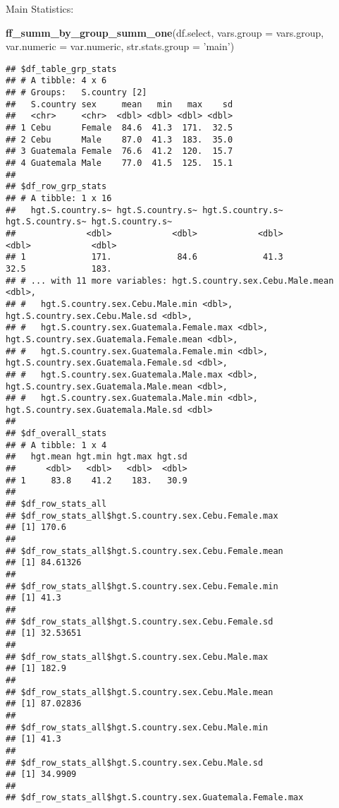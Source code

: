 \documentclass[
]{book}
\newenvironment{Shaded}{\begin{snugshade}}{\end{snugshade}}
\newcommand{\DataTypeTok}[1]{\textcolor[rgb]{0.13,0.29,0.53}{#1}}
\newcommand{\KeywordTok}[1]{\textcolor[rgb]{0.13,0.29,0.53}{\textbf{#1}}}
\newcommand{\NormalTok}[1]{#1}
\newcommand{\StringTok}[1]{\textcolor[rgb]{0.31,0.60,0.02}{#1}}
\begin{document}
Main Statistics:

\begin{Shaded}
\begin{Highlighting}[]
\KeywordTok{ff_summ_by_group_summ_one}\NormalTok{(df.select, }\DataTypeTok{vars.group =}\NormalTok{ vars.group, }\DataTypeTok{var.numeric =}\NormalTok{ var.numeric, }\DataTypeTok{str.stats.group =} \StringTok{'main'}\NormalTok{)}
\end{Highlighting}
\end{Shaded}

\begin{verbatim}
## $df_table_grp_stats
## # A tibble: 4 x 6
## # Groups:   S.country [2]
##   S.country sex     mean   min   max    sd
##   <chr>     <chr>  <dbl> <dbl> <dbl> <dbl>
## 1 Cebu      Female  84.6  41.3  171.  32.5
## 2 Cebu      Male    87.0  41.3  183.  35.0
## 3 Guatemala Female  76.6  41.2  120.  15.7
## 4 Guatemala Male    77.0  41.5  125.  15.1
## 
## $df_row_grp_stats
## # A tibble: 1 x 16
##   hgt.S.country.s~ hgt.S.country.s~ hgt.S.country.s~ hgt.S.country.s~ hgt.S.country.s~
##              <dbl>            <dbl>            <dbl>            <dbl>            <dbl>
## 1             171.             84.6             41.3             32.5             183.
## # ... with 11 more variables: hgt.S.country.sex.Cebu.Male.mean <dbl>,
## #   hgt.S.country.sex.Cebu.Male.min <dbl>, hgt.S.country.sex.Cebu.Male.sd <dbl>,
## #   hgt.S.country.sex.Guatemala.Female.max <dbl>, hgt.S.country.sex.Guatemala.Female.mean <dbl>,
## #   hgt.S.country.sex.Guatemala.Female.min <dbl>, hgt.S.country.sex.Guatemala.Female.sd <dbl>,
## #   hgt.S.country.sex.Guatemala.Male.max <dbl>, hgt.S.country.sex.Guatemala.Male.mean <dbl>,
## #   hgt.S.country.sex.Guatemala.Male.min <dbl>, hgt.S.country.sex.Guatemala.Male.sd <dbl>
## 
## $df_overall_stats
## # A tibble: 1 x 4
##   hgt.mean hgt.min hgt.max hgt.sd
##      <dbl>   <dbl>   <dbl>  <dbl>
## 1     83.8    41.2    183.   30.9
## 
## $df_row_stats_all
## $df_row_stats_all$hgt.S.country.sex.Cebu.Female.max
## [1] 170.6
## 
## $df_row_stats_all$hgt.S.country.sex.Cebu.Female.mean
## [1] 84.61326
## 
## $df_row_stats_all$hgt.S.country.sex.Cebu.Female.min
## [1] 41.3
## 
## $df_row_stats_all$hgt.S.country.sex.Cebu.Female.sd
## [1] 32.53651
## 
## $df_row_stats_all$hgt.S.country.sex.Cebu.Male.max
## [1] 182.9
## 
## $df_row_stats_all$hgt.S.country.sex.Cebu.Male.mean
## [1] 87.02836
## 
## $df_row_stats_all$hgt.S.country.sex.Cebu.Male.min
## [1] 41.3
## 
## $df_row_stats_all$hgt.S.country.sex.Cebu.Male.sd
## [1] 34.9909
## 
## $df_row_stats_all$hgt.S.country.sex.Guatemala.Female.max

\end{verbatim}
\end{document}
